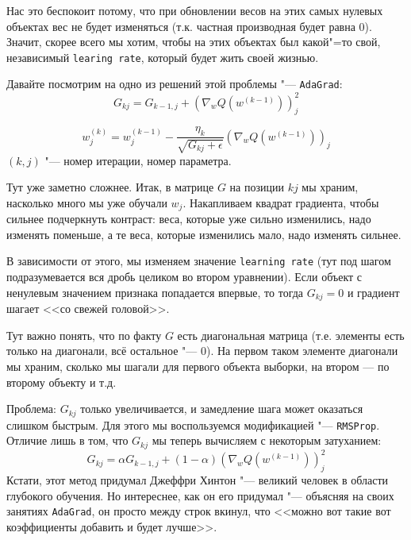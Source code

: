 Нас это беспокоит потому, что при обновлении весов на этих самых нулевых объектах вес не будет изменяться (т.к. частная производная будет равна 0). Значит, скорее всего мы хотим, чтобы на этих объектах был какой"=то свой, независимый \texttt{learing rate}, который будет жить своей жизнью.

Давайте посмотрим на одно из решений этой проблемы "--- \texttt{AdaGrad}:
\[
G_{kj} = G_{k-1, j} + (\nabla_w Q(w^{(k-1)}))_j^2
\]

\[
w_j^{(k)} = w_j^{(k-1)} - \frac{\eta_k}{\sqrt{G_{kj} + \epsilon}}(\nabla_w Q(w^{(k-1)}))_j
\]
$(k, j)$ "--- номер итерации, номер параметра.

Тут уже заметно сложнее. Итак, в матрице $G$ на позиции $kj$ мы храним, насколько много мы уже обучали $w_j$. Накапливаем квадрат градиента, чтобы сильнее подчеркнуть контраст: веса, которые уже сильно изменились, надо изменять поменьше, а те веса, которые изменились мало, надо изменять сильнее.

В зависимости от этого, мы изменяем значение \texttt{learning rate} (тут под шагом подразумевается вся дробь целиком во втором уравнении). Если объект с ненулевым значением признака попадается впервые, то тогда $G_{kj} = 0$ и градиент шагает <<со свежей головой>>. 

Тут важно понять, что по факту $G$ есть диагональная матрица (т.е. элементы есть только на диагонали, всё остальное "--- 0). На первом таком элементе диагонали мы храним, сколько мы шагали для первого объекта выборки, на втором --- по второму объекту и т.д.

\newpage
Проблема: $G_{kj}$ только увеличивается, и замедление шага может оказаться слишком быстрым. Для этого мы воспользуемся модификацией "--- \texttt{RMSProp}. Отличие лишь в том, что $G_{kj}$ мы теперь вычисляем с некоторым затуханием:
\[
G_{kj} = \alpha G_{k-1, j} + (1 - \alpha)(\nabla_w Q(w^{(k-1)}))_j^2
\]
Кстати, этот метод придумал Джеффри Хинтон "--- великий человек в области глубокого обучения.
Но интереснее, как он его придумал "--- объясняя на своих занятиях \texttt{AdaGrad}, он просто между строк вкинул, что <<можно вот такие вот коэффициенты добавить и будет лучше>>.